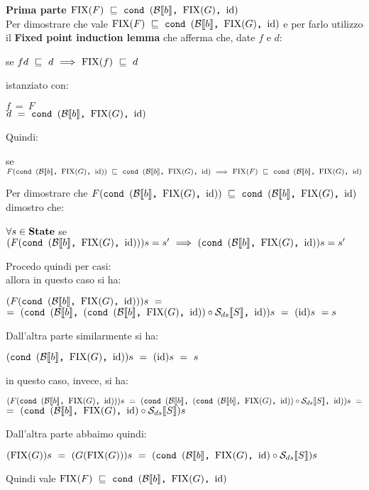 {    \textbf{Prima parte $\fixp{F}~\mineq~\cond{b}{\fixp{G}}{\idDS}$}\\
    Per dimostrare che vale $\fixp{F}~\mineq~\cond{b}{\fixp{G}}{\idDS}$
    e per farlo utilizzo il \textbf{Fixed point induction lemma} che afferma
    che, date $f$ e $d$:
    \begin{center}
    se $fd~\mineq~d~\Longrightarrow~\fixp{f}~\mineq~d$
    \end{center}
    istanziato con:
    \begin{center}
    $f~=~F$ \\
    $d~=~\cond{b}{\fixp{G}}{\idDS}$
    \end{center}
    Quindi:
    \begin{center}
    se $F(\cond{b}{\fixp{G}}{\idDS})~\mineq~\cond{b}{\fixp{G}}{\idDS}~
    \Longrightarrow~\fixp{F}~\mineq~\cond{b}{\fixp{G}}{\idDS}$
    \end{center}
    Per dimostrare che $F(\cond{b}{\fixp{G}}{\idDS})~\mineq~
    \cond{b}{\fixp{G}}{\idDS}$ dimostro che:
    \begin{center}
    $\forall{} s\in\states$ se $(F(\cond{b}{\fixp{G}}{\idDS}))s=s'~
    \Longrightarrow~(\cond{b}{\fixp{G}}{\idDS})s=s'$
    \end{center}
    Procedo quindi per casi:\\
     allora in questo caso si ha:
    \begin{center}
    $(F(\cond{b}{\fixp{G}}{\idDS}))s~=$\\$=~
    (\cond{b}{(\cond{b}{\fixp{G}}{\idDS}) \circ{} \Sds{}}{\idDS})s~=~
    (\idDS)s~=s$
    \end{center}
    Dall'altra parte similarmente si ha:
    \begin{center}
    $(\cond{b}{\fixp{G}}{\idDS})s~=~(\idDS)s~=~s$
    \end{center}
     in questo caso, invece, si ha:
    \begin{center}
    $(F(\cond{b}{\fixp{G}}{\idDS}))s~=~(\cond{b}{(\cond{b}{\fixp{G}}{\idDS})
    \circ{} \Sds{}}{\idDS})s~=$\\$=~(\cond{b}{\fixp{G}}{\idDS} \circ{} \Sds{})s$
    \end{center}
    Dall'altra parte abbaimo quindi:
    \begin{center}
    $(\fixp{G})s~=~(G(\fixp{G}))s~=~(\cond{b}{\fixp{G}}{\idDS} \circ \Sds)s$
    \end{center}
    Quindi vale $\fixp{F}~\mineq~\cond{b}{\fixp{G}}{\idDS}$
}
\newpage